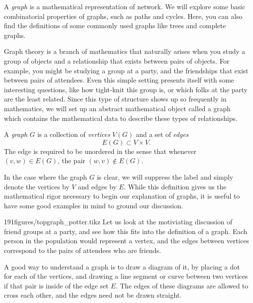 \begin{elevator}	
A \emph{graph} is a mathematical representation of network. We will explore some basic combinatorial properties of graphs, such as paths and cycles. Here, you can also find the definitions of some commonly used graphs like trees and complete graphs. 
\end{elevator}%
\label{sec:graph:basic}%
Graph theory is a branch of mathematics that naturally arises when you study a group of objects and a relationship that exists between pairs of objects.
For example, you might be studying a group at a party, and the friendships that exist between pairs of attendees.
Even this simple setting presents itself with some interesting questions, like how tight-knit this group is, or which folks at the party are the least related.
Since this type of structure shows up so frequently in mathematics, we will set up an abstract mathematical object called a graph which contains the mathematical data to describe these types of relationships.
\begin{definition}[Graph]
	A \emph{graph} $G$ is a collection of \emph{vertices} $V(G)$ and a set of \emph{edges} 
	\[E(G)\subset V\times V.\]
	The edge is required to be unordered in the sense that  whenever $(v,  w)\in E(G)$,  the pair  $(w,  v)\not\in E(G)$.
\end{definition}
In the case where the graph $G$ is clear, we will suppress the label and simply denote the vertices  by $V$ and edges by $E$.
While this definition gives us the mathematical rigor necessary to begin our explanation of graphs, it is useful to have some good examples in mind to ground our discussion.
\begin{examplefigureenv}{191figures/topgraph_potter.tikz}
Let us look at the motiviating discussion of friend groups at a party, and see how this fits into the definition of a graph.
Each person in the population would represent a vertex, and the edges between vertices correspond to the pairs of attendees who are friends.
\end{examplefigureenv}

A good way to understand a graph is to draw a diagram of it, by placing a  dot for each of the vertices, and drawing a line segment or curve between two vertices if that pair is inside of the edge set $E$. 
The edges of these diagrams are allowed to cross each other, and the edges need not be drawn straight.

